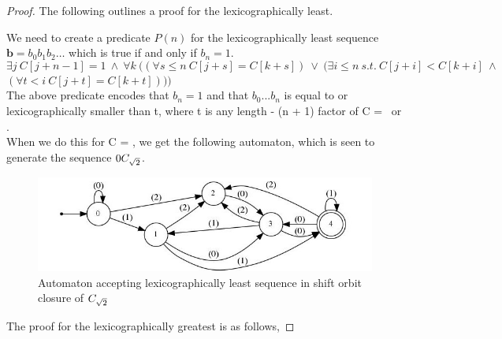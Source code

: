 \begin{proof}
The following outlines a proof for the lexicographically least. 
\newline 

We need to create a predicate $P(n)$ for the lexicographically least sequence $\mathbf{b} = b_{0}b_{1}b_{2} \ldots$ which is true if and only if $b_{n} = 1$.
 
\begin{equation*}
    \exists j\ C[j+n-1]=1\ \wedge\ \forall k\ ((\forall s \leq n\ C[j+s]=C[k+s])\ \vee \ (\exists i \leq n\ s.t.\ C[j+i] < C[k+i]\ \wedge
\end{equation*} 
$(\forall t < i\ C[j+t]=C[k+t])))$ \newline \\
The above predicate encodes that $b_{n}=1$ and that $b_{0}...b_{n}$ is equal to or lexicographically smaller than t, where t is any length - (n + 1) factor of C = \Ctwo\ or \Cthree.\\  \newline
When we do this for C = \Ctwo, we get the following automaton, which is seen to generate the sequence $0C_{\sqrt{2}}$. \\ \newline {}
\begin{figure}[h]
    \centering
    \includegraphics[width=\textwidth]{sturmian_word_paper/paper_images/theorem29C2.jpg}
    \caption{Automaton accepting lexicographically least sequence in shift orbit closure of $C_{\sqrt{2}}$}
\end{figure}
The proof for the lexicographically greatest is as follows, \newline 


\end{proof}
